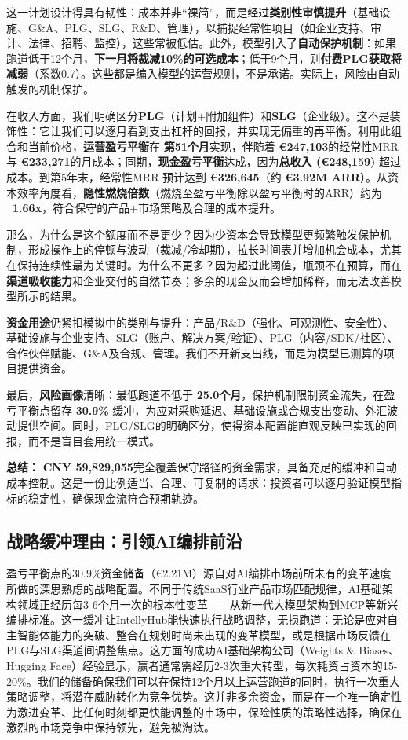\documentclass[11点, A4纸, 单面]{article}
\begin{document}
这一计划设计得具有韧性：成本并非“裸简”，而是经过\textbf{类别性审慎提升}（基础设施、G\&A、PLG、SLG、R\&D、管理），以捕捉经常性项目（如企业支持、审计、法律、招聘、监控），这些常被低估。此外，模型引入了\textbf{自动保护机制}：如果跑道低于12个月，\textbf{下一月将裁减10\%的可选成本}；低于9个月，则\textbf{付费PLG获取将减弱}（系数0.7）。这些都是编入模型的运营规则，不是承诺。实际上，风险由自动触发的机制保护。

在收入方面，我们明确区分\textbf{PLG}（计划+附加组件）和\textbf{SLG}（企业级）。这不是装饰性：它让我们可以逐月看到支出杠杆的回报，并实现无偏重的再平衡。利用此组合和当前价格，\textbf{运营盈亏平衡}在 \textbf{第51个月}实现，伴随着 \textbf{€247{,}103}的经常性MRR 与 \textbf{€233{,}271}的月成本；同期，\textbf{现金盈亏平衡}达成，因为\textbf{总收入 (€248{,}159)} 超过成本。到第5年末，经常性MRR 预计达到 \textbf{€326{,}645}（约 \textbf{€3.92M ARR}）。从资本效率角度看，\textbf{隐性燃烧倍数}（燃烧至盈亏平衡除以盈亏平衡时的ARR）约为 \textbf{~1.66x}，符合保守的产品+市场策略及合理的成本提升。

那么，为什么是这个额度而不是更少？因为少资本会导致模型更频繁触发保护机制，形成操作上的停顿与波动（裁减/冷却期），拉长时间表并增加机会成本，尤其在保持连续性最为关键时。为什么不更多？因为超过此阈值，瓶颈不在预算，而在\textbf{渠道吸收能力}和企业交付的自然节奏；多余的现金反而会增加稀释，而无法改善模型所示的结果。

\textbf{资金用途}仍紧扣模拟中的类别与提升：产品/R\&D（强化、可观测性、安全性）、基础设施与企业支持、SLG（账户、解决方案/验证）、PLG（内容/SDK/社区）、合作伙伴赋能、G\&A及合规、管理。我们不开新支出线，而是为模型已测算的项目提供资金。

最后，\textbf{风险画像}清晰：最低跑道不低于 \textbf{25.0个月}，保护机制限制资金流失，在盈亏平衡点留存 \textbf{30.9\%} 缓冲，为应对采购延迟、基础设施或合规支出变动、外汇波动提供空间。同时，PLG/SLG的明确区分，使得资本配置能直观反映已实现的回报，而不是盲目套用统一模式。

\textbf{总结：} \textbf{CNY 59{,}829{,}055}完全覆盖保守路径的资金需求，具备充足的缓冲和自动成本控制。这是一份比例适当、合理、可复制的请求：投资者可以逐月验证模型指标的稳定性，确保现金流符合预期轨迹。

\subsection{战略缓冲理由：引领AI编排前沿}
盈亏平衡点的30.9\%资金储备（€2.21M）源自对AI编排市场前所未有的变革速度所做的深思熟虑的战略配置。不同于传统SaaS行业产品市场匹配规律，AI基础架构领域正经历每3-6个月一次的根本性变革——从新一代大模型架构到MCP等新兴编排标准。这一缓冲让IntellyHub能快速执行战略调整，无损跑道：无论是应对自主智能体能力的突破、整合在规划时尚未出现的变革模型，或是根据市场反馈在PLG与SLG渠道间调整焦点。这方面的成功AI基础架构公司（Weights \& Biases、Hugging Face）经验显示，赢者通常需经历2-3次重大转型，每次耗资占资本的15-20\%。我们的储备确保我们可以在保持12个月以上运营跑道的同时，执行一次重大策略调整，将潜在威胁转化为竞争优势。这并非多余资金，而是在一个唯一确定性为激进变革、比任何时刻都更快能调整的市场中，保险性质的策略性选择，确保在激烈的市场竞争中保持领先，避免被淘汰。
\end{document}
